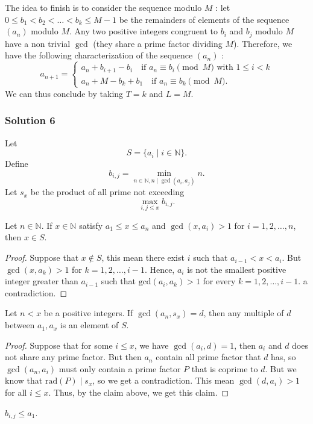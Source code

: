 \documentclass[11pt]{article}
\begin{document}
The idea to finish is to consider the sequence modulo $M$ : let $0\le b_1<b_2<\ldots<b_k\le M-1$ be the remainders of elements of the sequence $(a_n)$ modulo $M$. Any two positive integers congruent to $b_i$ and $b_j$ modulo $M$ have a non trivial $\gcd$ (they share a prime factor dividing $M$). Therefore, we have the following characterization of the sequence $(a_n)$ :
\[a_{n+1}=\begin{cases}
        a_n+b_{i+1}-b_i \quad \text{if $a_n\equiv b_i\pmod M$ with $1\le i<k$}\\
        a_n+M-b_k+b_1\quad \text{if $a_n\equiv b_k\pmod M$}.
    \end{cases}\]We can thus conclude by taking $T=k$ and $L=M$. 
\newpage
\subsubsection{Solution 6}
Let $$S = \{a_i \mid i \in \mathbb{N}\}.$$
Define $$b_{i,j} = \min_{n \in \mathbb{N}, n \mid \gcd(a_i,a_j)} n.$$
Let $s_x$ be the product of all prime not exceeding $$\max_{i,j \leqslant x} b_{i,j}.$$
\begin{claim}
    Let $n \in \mathbb{N}$. If $x \in \mathbb{N}$ satisfy $a_1 \leqslant x \leqslant a_n$ and $\gcd(x,a_i) >1$ for $i=1,2,\dots,n$, then $x \in S$.
\end{claim}
\begin{proof}
    Suppose that $x \not\in S$, this mean there exist $i$ such that $a_{i-1} < x < a_i$. But $\gcd(x,a_k) >1$ for $k=1,2,\dots,i-1$. Hence, $a_i$ is not the smallest positive integer greater than $a_{i-1}$ such that $\text{gcd}(a_{i}, a_k)>1$ for every $k=1,2,\ldots, i-1$. a contradiction.
\end{proof}
\begin{claim}
    Let $n<x$ be a positive integers. If $\gcd(a_n,s_x) =d$, then any multiple of $d$ between $a_1,a_x$ is an element of $S$.
\end{claim}
\begin{proof}
    Suppose that for some $i \leqslant x$, we have $\gcd(a_i,d) =1$, then $a_i$ and $d$ does not share any prime factor. But then $a_n$ contain all prime factor that $d$ has, so $\gcd(a_n,a_i)$ must only contain a prime factor $P$ that is coprime to $d$. But we know that $\text{rad}(P) \mid s_x$, so we get a contradiction. This mean $\gcd(d,a_i) >1$ for all $i \leqslant x$. Thus, by the claim above, we get this claim.
\end{proof}
\begin{claim}
    $b_{i,j} \leqslant a_1$.
\end{claim}
\end{document}
